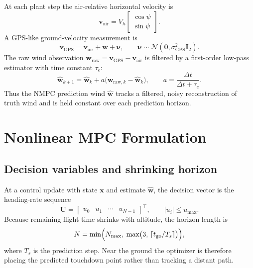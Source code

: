 \documentclass[conference]{IEEEtran}
\begin{document}
At each plant step the air-relative horizontal velocity is
\begin{equation}
\mathbf{v}_{\mathrm{air}}
=
V_h
\begin{bmatrix}
\cos\psi \\
\sin\psi
\end{bmatrix}.
\label{eq:vair}
\end{equation}
A GPS-like ground-velocity measurement is
\begin{equation}
\mathbf{v}_{\mathrm{GPS}}
=
\mathbf{v}_{\mathrm{air}} + \mathbf{w} + \boldsymbol{\nu},
\qquad
\boldsymbol{\nu}\sim\mathcal{N}(\mathbf{0},\sigma_{\mathrm{GPS}}^2\mathbf{I}_2).
\label{eq:vgps}
\end{equation}
The raw wind observation $\mathbf{w}_{\mathrm{raw}}=\mathbf{v}_{\mathrm{GPS}}-\mathbf{v}_{\mathrm{air}}$ is filtered by a first-order low-pass estimator with time constant $\tau_e$:
\begin{equation}
\hat{\mathbf{w}}_{k+1}
=
\hat{\mathbf{w}}_k
+
a\bigl(\mathbf{w}_{\mathrm{raw},k}-\hat{\mathbf{w}}_k\bigr),
\qquad
a = \frac{\Delta t}{\Delta t+\tau_e}.
\label{eq:lpf}
\end{equation}
Thus the NMPC prediction wind $\hat{\mathbf{w}}$ tracks a filtered, noisy reconstruction of truth wind and is held constant over each prediction horizon.

\section{Nonlinear MPC Formulation}

\subsection{Decision variables and shrinking horizon}

At a control update with state $\mathbf{x}$ and estimate $\hat{\mathbf{w}}$, the decision vector is the heading-rate sequence
\begin{equation}
\mathbf{U}
=
\begin{bmatrix}
u_0 & u_1 & \cdots & u_{N-1}
\end{bmatrix}^{\!\top},
\qquad
|u_i|\le u_{\max}.
\label{eq:U}
\end{equation}
Because remaining flight time shrinks with altitude, the horizon length is
\begin{equation}
N
=
\min\Bigl(N_{\max},\;
\max\bigl(3,\,\lceil t_{\mathrm{go}}/T_s\rceil\bigr)
\Bigr),
\label{eq:N}
\end{equation}
where $T_s$ is the prediction step.
Near the ground the optimizer is therefore placing the predicted touchdown point rather than tracking a distant path.
\end{document}
